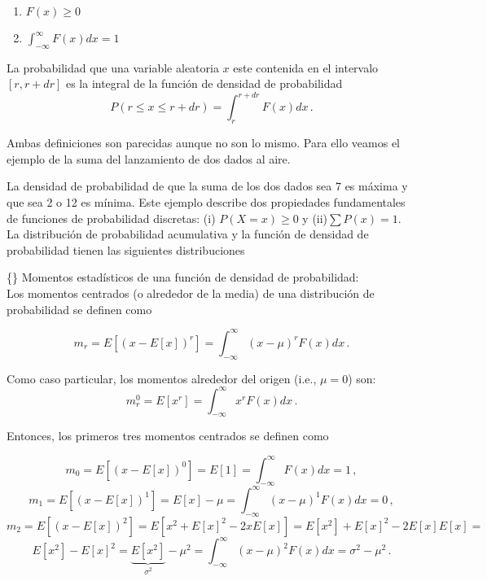 \documentclass[
]{agujournal2019}
\providecommand{\tightlist}{%
  \setlength{\itemsep}{0pt}\setlength{\parskip}{0pt}}\usepackage{longtable,booktabs,array}
\begin{document}
\begin{enumerate}
\def\labelenumi{(\arabic{enumi})}
\tightlist
\item
  \(F(x)\ge0\)\\
\item
  \(\int^{\infty}_{-\infty} F(x) dx=1\)\\
\end{enumerate}

La probabilidad que una variable aleatoria \(x\) este contenida en el
intervalo \([r,r+dr]\) es la integral de la función de densidad de
probabilidad \[P(r\le x\le r+dr)=\int^{r+dr}_r F(x)dx\,.\]

Ambas definiciones son parecidas aunque no son lo mismo. Para ello
veamos el ejemplo de la suma del lanzamiento de dos dados al aire.\\

\begin{center}
\end{center}

La densidad de probabilidad de que la suma de los dos dados sea 7 es
máxima y que sea 2 o 12 es mínima. Este ejemplo describe dos propiedades
fundamentales de funciones de probabilidad discretas: (i)
\(P(X=x) \ge 0\) y (ii)\(\sum{P(x)}=1\). La distribución de probabilidad
acumulativa y la función de densidad de probabilidad tienen las
siguientes distribuciones\\

\begin{center}
\end{center}

\vspace{0.5cm}

\{\noindent\} Momentos estadísticos de una función de densidad de
probabilidad:\\

Los momentos centrados (o alrededor de la media) de una distribución de
probabilidad se definen como

\[m_r=E[(x-E[x])^r]=\int^{\infty}_{-\infty} (x-\mu)^rF(x)dx\,.\]

Como caso particular, los momentos alrededor del origen (i.e.,
\(\mu=0\)) son: \[m^0_r=E[x^r]=\int^{\infty}_{-\infty} x^rF(x)dx\,.\]

Entonces, los primeros tres momentos centrados se definen como

\[m_0=E[(x-E[x])^0]=E[1]=\int^{\infty}_{-\infty}F(x)dx=1\,,\]
\[m_1=E[(x-E[x])^1]=E[x]-\mu=\int^{\infty}_{-\infty} (x-\mu)^1 F(x)dx=0\,,\]
\[m_2=E[(x-E[x])^2]=E[x^2 + E[x]^2 -2xE[x]]=
      E[x^2]+E[x]^2-2E[x]E[x]=\]
\[E[x^2]-E[x]^2=\underbrace{E[x^2]}_{\sigma^2}-\mu^2=\int^{\infty}_{-\infty} (x-\mu)^2 F(x)dx=\sigma^2-\mu^2\,.\]
\end{document}
